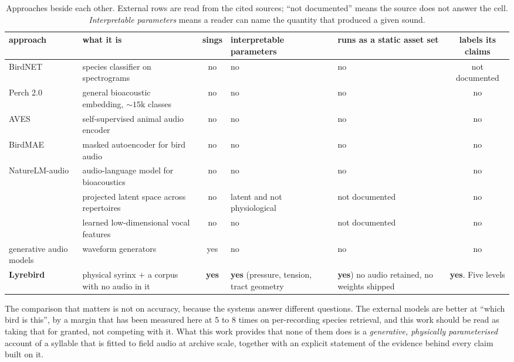 \documentclass[10pt,twocolumn,a4paper]{article}
\begin{document}
\begin{table}[t]
\centering
\small
\caption{Approaches beside each other. External rows are read from the cited sources;
``not documented'' means the source does not answer the cell. \emph{Interpretable
parameters} means a reader can name the quantity that produced a given sound.}
\label{tab:positioning}
\begin{tabular}{L{2.9cm} L{3.5cm} c L{2.5cm} L{2.6cm} c}
\toprule
approach & what it is & sings & interpretable parameters & runs as a static asset set & labels its claims \\
\midrule
BirdNET \citep{birdnet2021} & species classifier on spectrograms & no & no & no & not documented \\
Perch 2.0 \citep{perch2} & general bioacoustic embedding, ${\sim}15$k classes & no & no & no & no \\
AVES \citep{aves2022} & self-supervised animal audio encoder & no & no & no & no \\
BirdMAE \citep{birdmae2025} & masked autoencoder for bird audio & no & no & no & no \\
NatureLM-audio \citep{naturelm2024} & audio-language model for bioacoustics & no & no & no & no \\
\citet{sainburg2020} & projected latent space across repertoires & no & latent and not physiological & not documented & no \\
\citet{goffinet2021} & learned low-dimensional vocal features & no & no & not documented & no \\
generative audio models & waveform generators & yes & no & no & no \\
\textbf{Lyrebird} & physical syrinx $+$ a corpus with no audio in it & \textbf{yes} & \textbf{yes} (pressure, tension, tract geometry & \textbf{yes}) no audio retained, no weights shipped & \textbf{yes}. Five levels \\
\bottomrule
\end{tabular}
\end{table}

The comparison that matters is not on accuracy, because the systems answer different
questions. The external models are better at ``which bird is this'', by a margin that has
been measured here at 5 to 8 times on per-recording species retrieval, and this work should
be read as taking that for granted, not competing with it. What this work provides
that none of them does is a \emph{generative, physically parameterised} account of a syllable
that is fitted to field audio at archive scale, together with an explicit statement of the
evidence behind every claim built on it.
\end{document}
